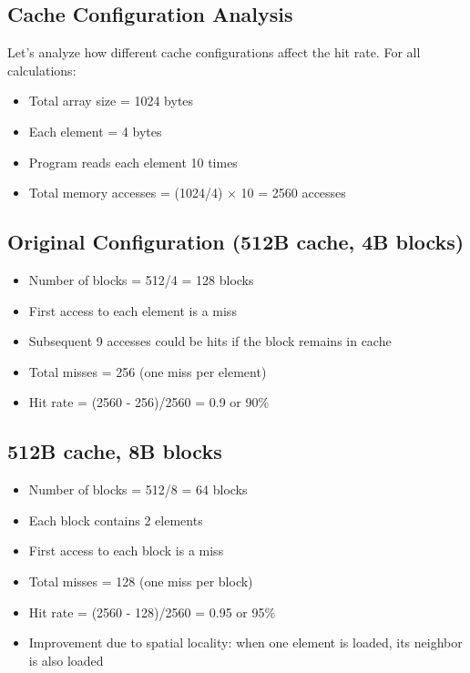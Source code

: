 \documentclass{article}
\begin{document}
\subsection{Cache Configuration Analysis}
Let's analyze how different cache configurations affect the hit rate. For all calculations:
\begin{itemize}
    \item Total array size = 1024 bytes
    \item Each element = 4 bytes
    \item Program reads each element 10 times
    \item Total memory accesses = (1024/4) × 10 = 2560 accesses
\end{itemize}

\subsection{Original Configuration (512B cache, 4B blocks)}
\begin{itemize}
    \item Number of blocks = 512/4 = 128 blocks
    \item First access to each element is a miss
    \item Subsequent 9 accesses could be hits if the block remains in cache
    \item Total misses = 256 (one miss per element)
    \item Hit rate = (2560 - 256)/2560 = 0.9 or 90\%
\end{itemize}

\subsection{512B cache, 8B blocks}
\begin{itemize}
    \item Number of blocks = 512/8 = 64 blocks
    \item Each block contains 2 elements
    \item First access to each block is a miss
    \item Total misses = 128 (one miss per block)
    \item Hit rate = (2560 - 128)/2560 = 0.95 or 95\%
    \item Improvement due to spatial locality: when one element is loaded, its neighbor is also loaded
\end{itemize}
\end{document}
